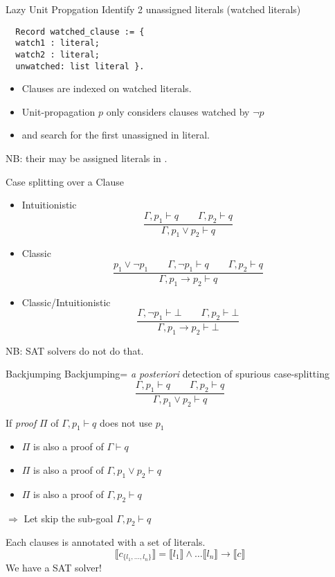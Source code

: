 \documentclass{beamer}
\begin{document}
\begin{frame}[fragile]{Lazy Unit Propgation}
Identify 2 unassigned literals (watched literals)
\begin{verbatim}
  Record watched_clause := {
  watch1 : literal;
  watch2 : literal;
  unwatched: list literal }.
\end{verbatim}
\begin{itemize}
\item Clauses are indexed on watched literals.
\item Unit-propagation $p$ only considers clauses watched by $\neg p$
\item and search for the first unassigned in  literal.
\end{itemize}
NB: their may be assigned literals in .\\
\end{frame}

\begin{frame}{Case splitting over a Clause}
  \begin{itemize}
  \item Intuitionistic 
    \[
      \dfrac{\Gamma,p_1 \vdash q \qquad \Gamma, p_2 \vdash q}
      {\Gamma, p_1 \lor p_2 \vdash q}
    \]
  \item Classic 
    \[
      \dfrac{ p_1 \lor \neg p_1 \qquad
        \Gamma, \neg p_1 \vdash q \qquad \Gamma, p_2 \vdash q }
      {\Gamma, p_1 \to p_2 \vdash q}
    \]
  \item Classic/Intuitionistic 
    \[
      \dfrac{ \Gamma, \neg p_1 \vdash \bot \qquad \Gamma, p_2 \vdash \bot}
      {\Gamma, p_1 \to p_2 \vdash \bot}
    \]
  \end{itemize}  
  NB: SAT solvers do not do that.
\end{frame}

\begin{frame}{Backjumping}
  Backjumping= \emph{a posteriori} detection of spurious case-splitting
  \[
   \dfrac{\Gamma,p_1 \vdash q \qquad \Gamma, p_2 \vdash q}
   {\Gamma, p_1 \lor p_2 \vdash q}
 \]
 \begin{theorem}
   If \emph{proof} $\Pi$ of $\Gamma,p_1 \vdash q$ does not use $p_1$
   \begin{itemize}
   \item $\Pi$ is also a proof of $\Gamma \vdash q$
   \item $\Pi$ is also a proof of $\Gamma, p_1 \lor p_2 \vdash q$
   \item $\Pi$ is also a proof of $\Gamma, p_2 \vdash q$
   \end{itemize}
 \end{theorem}
 $\Rightarrow$ Let skip the sub-goal $\Gamma, p_2 \vdash q$
 
 Each clauses is annotated with a set of literals.
\[
  \llbracket c_{\{l_1,\dots,l_n\}} \rrbracket = \llbracket l_1
  \rrbracket \land \dots \llbracket l_n \rrbracket \rightarrow
  \llbracket c \rrbracket
\]
We have a SAT solver! 
\end{frame}
\end{document}
